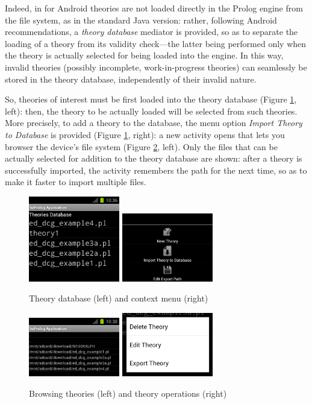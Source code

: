 Indeed, in \tuprolog{} for Android theories are not loaded directly in the Prolog engine from the file system, as in the standard Java version: rather, following Android recommendations, a \textit{theory database} mediator is provided, so as to separate the loading of a theory from its validity check---the latter being performed only when the theory is actually selected for being loaded into the engine. In this way, invalid theories (possibly incomplete, work-in-progress theories) can seamlessly be stored in the theory database, independently of their invalid nature.

So, theories of interest must be first loaded into the theory database (Figure \ref{fig:android34}, left): then, the theory to be actually loaded will be selected from such theories.
%
More precisely, to add a theory to the database, the menu option \textit{Import Theory to Database} is provided (Figure \ref{fig:android34}, right): a new activity opens that lets you browser the device's file system (Figure \ref{fig:android56}, left). Only the files that can be actually selected for addition to the theory database are shown: after a theory is successfully imported, the activity remembers the path for the next time, so as to make it faster to import multiple files.

\begin{figure}
\centering
  \includegraphics[width=150px]{images/android3.png}
  \includegraphics[width=150px]{images/android4.png}
  \caption{Theory database (left) and context menu (right)}\label{fig:android34}
\end{figure}

\begin{figure}
\centering
  \includegraphics[width=150px]{images/android6.png}
  \includegraphics[width=150px]{images/android5.png}
  \caption{Browsing theories (left) and theory operations (right)}\label{fig:android56}
\end{figure}

